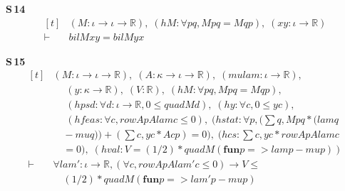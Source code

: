 \noindent\textbf{S\,14}\quad{}
{\footnotesize\[ \begin{aligned}[t]
&(\mathit{M} : \iota \to \iota \to \mathbb{R} ),\; (\mathit{hM} : \forall \mathit{p} \mathit{q}, \mathit{M} \mathit{p} \mathit{q} = \mathit{M} \mathit{q} \mathit{p}),\; (\mathit{x} \mathit{y} : \iota \to \mathbb{R} )\\
\vdash\;&\mathit{bil} \mathit{M} \mathit{x} \mathit{y} = \mathit{bil} \mathit{M} \mathit{y} \mathit{x}
\end{aligned} \]}

\noindent\textbf{S\,15}\quad{}
{\footnotesize\[ \begin{aligned}[t]
&(\mathit{M} : \iota \to \iota \to \mathbb{R} ),\; (\mathit{A} : \kappa \to \iota \to \mathbb{R} ),\; (\mathit{mu} \mathit{lam} : \iota \to \mathbb{R} ),\\
&\quad \; (\mathit{y} : \kappa \to \mathbb{R} ),\; (\mathit{V} : \mathbb{R} ),\; (\mathit{hM} : \forall \mathit{p} \mathit{q}, \mathit{M} \mathit{p} \mathit{q} = \mathit{M} \mathit{q} \mathit{p}),\\
&\quad \; (\mathit{hpsd} : \forall \mathit{d} : \iota \to \mathbb{R} , 0 \leq \mathit{quad} \mathit{M} \mathit{d}),\; (\mathit{hy} : \forall \mathit{c}, 0 \leq \mathit{y} \mathit{c}),\\
&\quad \; (\mathit{hfeas} : \forall \mathit{c}, \mathit{rowAp} \mathit{A} \mathit{lam} \mathit{c} \leq 0),\; (\mathit{hstat} : \forall \mathit{p}, (\textstyle\sum \mathit{q}, \mathit{M} \mathit{p} \mathit{q} * (\mathit{lam} \mathit{q}\\
&\quad - \mathit{mu} \mathit{q})) + (\textstyle\sum \mathit{c}, \mathit{y} \mathit{c} * \mathit{A} \mathit{c} \mathit{p}) = 0),\; (\mathit{hcs} : \textstyle\sum \mathit{c}, \mathit{y} \mathit{c} * \mathit{rowAp} \mathit{A} \mathit{lam} \mathit{c}\\
&\quad = 0),\; (\mathit{hval} : \mathit{V} = (1/2) * \mathit{quad} \mathit{M} (\mathbf{fun} \mathit{p} => \mathit{lam} \mathit{p} - \mathit{mu} \mathit{p}))\\
\vdash\;&\forall \mathit{lam'} : \iota \to \mathbb{R} , (\forall \mathit{c}, \mathit{rowAp} \mathit{A} \mathit{lam'} \mathit{c} \leq 0) \to \mathit{V} \leq\\
&\quad (1/2) * \mathit{quad} \mathit{M} (\mathbf{fun} \mathit{p} => \mathit{lam'} \mathit{p} - \mathit{mu} \mathit{p})
\end{aligned} \]}

